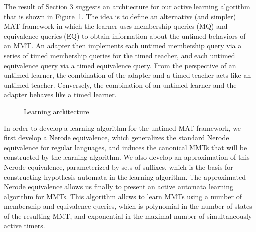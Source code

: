 The result of Section 3 suggests an architecture for our active learning algorithm that is shown in Figure~\ref{architecture}.
The idea is to define an alternative (and simpler) MAT framework in which the learner uses membership queries (MQ) and equivalence queries (EQ)
to obtain information about the untimed behaviors of an MMT.
An adapter then implements each untimed membership query via a series of timed membership queries for the timed teacher,
and each untimed equivalence query via a timed equivalence query.
From the perspective of an untimed learner, the combination of the adapter and a timed teacher acts like an untimed teacher.
Conversely, the combination of an untimed learner and the adapter behaves like a timed learner.
\begin{figure}[h]
\begin{center}
\end{center}
\caption{Learning architecture}
\label{architecture}
\end{figure}

In order to develop a learning algorithm for the untimed MAT framework, we first develop
a Nerode equivalence, which generalizes the standard Nerode equivalence for
regular languages, and induces the canonical MMTs that will be constructed by the learning algorithm. 
We also develop an approximation of this Nerode equivalence,
parameterized by sets of suffixes, which is the basis for constructing
hypothesis automata in the learning algorithm. The approximated Nerode
equivalence allows us finally to present an active automata learning
algorithm for MMTs. This algorithm allows to learn MMTs using a number
of membership and equivalence queries, which is polynomial in the number of
states of the resulting MMT, and exponential in the maximal number of
simultaneously active timers.

